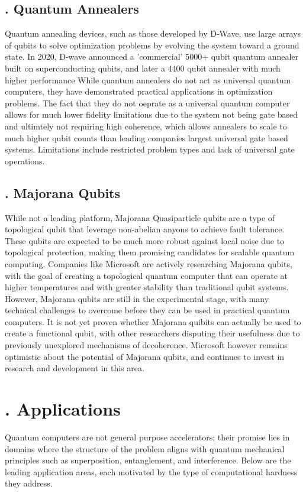 \documentclass{elbioimp2}
\begin{document}
\subsection{. Quantum Annealers}
Quantum annealing devices, such as those developed by D-Wave, use large arrays of qubits to solve optimization problems by evolving the system toward a ground state. In 2020, D-wave announced a 'commercial' 5000+ qubit quantum annealer built on superconducting qubits, and later a 4400 qubit annealer with much higher performance\cite{DWave2024} While quantum annealers do not act as universal quantum computers, they have demonstrated practical applications in optimization problems. The fact that they do not oeprate as a universal quantum computer allows for much lower fidelity limitations due to the system not being gate based and ultimtely not requiring high coherence, which allows annealers to scale to much higher qubit counts than leading companies largest universal gate based systems. Limitations include restricted problem types and lack of universal gate operations.

\subsection{. Majorana Qubits}
While not a leading platform, Majorana Quasiparticle qubits are a type of topological qubit that leverage non-abelian anyons to achieve fault tolerance. These qubits are expected to be much more robust against local noise due to topological protection, making them promising candidates for scalable quantum computing. Companies like Microsoft are actively researching Majorana qubits, with the goal of creating a topological quantum computer that can operate at higher temperatures and with greater stability than traditional qubit systems. However, Majorana qubits are still in the experimental stage, with many technical challenges to overcome before they can be used in practical quantum computers. It is not yet proven whether Majorana quibits can actually be used to create a functional qubit, with other researchers disputing their usefulness due to previously unexplored mechanisms of decoherence\cite{alase2025decoherencemajoranaqubits1f}. Microsoft however remains optimistic about the potential of Majorana qubits, and continues to invest in research and development in this area.

\section{. Applications}
Quantum computers are not general purpose accelerators; their promise lies in domains where the structure of the problem aligns with quantum mechanical principles such as superposition, entanglement, and interference. Below are the leading application areas, each motivated by the type of computational hardness they address.
\end{document}
